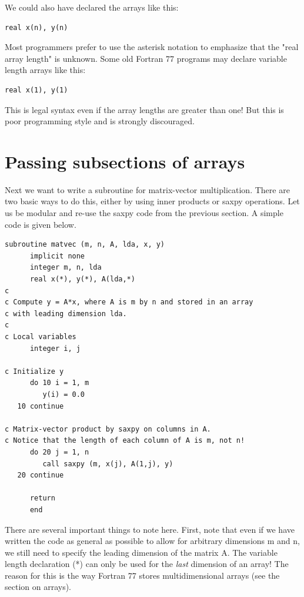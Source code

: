 We could also have declared the arrays like this:

\begin{lstlisting}[style=fortran77]
      real x(n), y(n)
\end{lstlisting}

Most programmers prefer to use the asterisk notation to emphasize that the "real array length" is unknown. Some old Fortran 77 programs may declare variable length arrays like this:

\begin{lstlisting}[style=fortran77]
      real x(1), y(1)
\end{lstlisting}

This is legal syntax even if the array lengths are greater than one! But this is poor programming style and is strongly discouraged.

\section{Passing subsections of arrays}

Next we want to write a subroutine for matrix-vector multiplication. There are two basic ways to do this, either by using inner products or saxpy operations. Let us be modular and re-use the saxpy code from the previous section. A simple code is given below.

\begin{lstlisting}[style=fortran77]
      subroutine matvec (m, n, A, lda, x, y)
      implicit none
      integer m, n, lda
      real x(*), y(*), A(lda,*)
c
c Compute y = A*x, where A is m by n and stored in an array
c with leading dimension lda.
c
c Local variables
      integer i, j
      
c Initialize y
      do 10 i = 1, m
         y(i) = 0.0
   10 continue

c Matrix-vector product by saxpy on columns in A.
c Notice that the length of each column of A is m, not n!
      do 20 j = 1, n
         call saxpy (m, x(j), A(1,j), y)
   20 continue

      return
      end
\end{lstlisting}

There are several important things to note here. First, note that even if we have written the code as general as possible to allow for arbitrary dimensions m and n, we still need to specify the leading dimension of the matrix A. The variable length declaration (*) can only be used for the \emph{last} dimension of an array! The reason for this is the way Fortran 77 stores multidimensional arrays (see the section on arrays).

